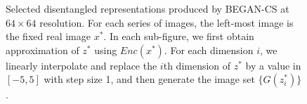 \documentclass[runningheads]{llncs}
\begin{document}
    
    \begin{figure}[t]
        \centering
            
    
        
        \caption{Selected disentangled representations produced by BEGAN-CS at $64 \times 64$ resolution. For each series of images, the left-most image is the fixed real image $x^*$. In each sub-figure, we first obtain approximation of $z^*$ using $Enc(x^*)$. For each dimension $i$, we linearly interpolate and replace the $i$th dimension of $z^*$ by a value in $[-5, 5]$ with step size 1, and then generate the image set $\{G(z^*_i)\}$.}
        \label{figure:disentangled-representations}
    \end{figure}
\end{document}
